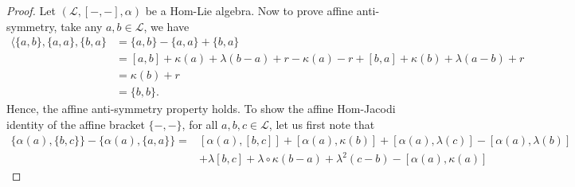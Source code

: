 \documentclass[14pt]{article}
\theoremstyle{Definition}
\theoremstyle{remark}
\begin{document}
\begin{proof}
Let $(\mathcal{L},[-,-],\alpha)$ be a Hom-Lie algebra. Now to prove affine anti-symmetry, take any $a,b\in \mathcal{L}$, we have 
\begin{align*}
\langle\{a,b\},\{a,a\},\{b,a\}&=\{a,b\}-\{a,a\}+\{b,a\}\\
&=[a,b]+\kappa(a)+\lambda(b-a)+r-\kappa(a)-r+[b,a]+\kappa(b)+\lambda(a-b)+r\\
&=\kappa(b)+r\\
&=\{b,b\}.
\end{align*}
Hence, the affine anti-symmetry property holds.
To show the affine Hom-Jacodi identity of the affine bracket $\{-,-\}$, for all $a,b,c\in \mathcal{L}$, let us first note that
\begin{align*}
\{\alpha(a),\{b,c\}\}-\{\alpha(a),\{a,a\}\}=&[\alpha(a),[b,c]]+[\alpha(a),\kappa(b)]+[\alpha(a),\lambda(c)]-[\alpha(a),\lambda(b)]\\
&+\lambda[b,c]+\lambda\circ\kappa(b-a)+\lambda^{2}(c-b)-[\alpha(a),\kappa(a)]
\end{align*}



\end{proof}
\end{document}
